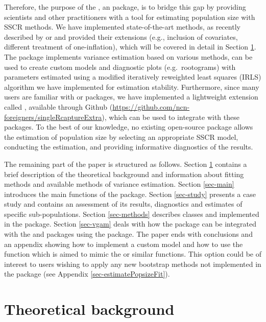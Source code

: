 \documentclass[nojss]{jss}
\newcommand{\1}{\mathcal{I}} \newcommand{\bZero}{\boldsymbol{0}}
\begin{document}
Therefore, the purpose of the , an 
package, is to bridge this gap by providing scientists and other
practitioners with a tool for estimating population size with SSCR
methods. We have implemented state-of-the-art methods, as recently
described by \citet{bohning2018capture} or \citet{bohning2024one} and
provided their extensions (e.g., inclusion of covariates, different
treatment of one-inflation), which will be covered in detail in Section
\ref{sec-theory}. The package implements variance estimation based on
various methods, can be used to create custom models and diagnostic
plots (e.g.~rootograms) with parameters estimated using a modified
iteratively reweighted least squares (IRLS) algorithm we have
implemented for estimation stability. Furthermore, since many
 users are familiar with  or 
packages, we have implemented a lightweight extension called
, available through Github
(\url{https://github.com/ncn-foreigners/singleRcaptureExtra}), which can
be used to integrate  with these packages. To the
best of our knowledge, no existing open-source package allows the
estimation of population size by selecting an appropriate SSCR model,
conducting the estimation, and providing informative diagnostics of the
results.

The remaining part of the paper is structured as follows. Section
\ref{sec-theory} contains a brief description of the theoretical
background and information about fitting methods and available methods
of variance estimation. Section \ref{sec-main} introduces the main
functions of the package. Section \ref{sec-study} presents a case study
and contains an assessment of its results, diagnostics and estimates of
specific sub-populations. Section \ref{sec-methods} describes classes
and  implemented in the package. Section \ref{sec-vgam}
deals with how the package can be integrated with the  and
 packages using the  package. The
paper ends with conclusions and an appendix showing how to implement a
custom model and how to use the  function which
is aimed to mimic the  or similar functions. This option
could be of interest to users wishing to apply any new bootstrap methods
not implemented in the package (see Appendix
\ref{sec-estimatePopsizeFit}).

\section{Theoretical background}\label{sec-theory}
\end{document}
